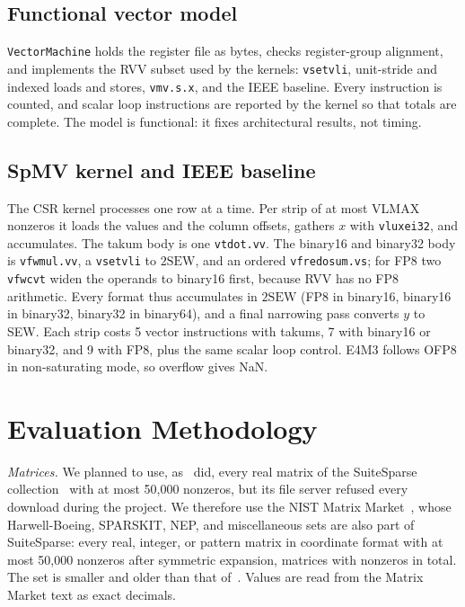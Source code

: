 \documentclass[conference]{IEEEtran}
\newcommand{\code}[1]{\texttt{#1}}
\begin{document}
\subsection{Functional vector model}
\code{VectorMachine} holds the register file as bytes, checks register-group
alignment, and implements the RVV subset used by the kernels: \code{vsetvli},
unit-stride and indexed loads and stores, \code{vmv.s.x}, and the IEEE baseline.
Every instruction is counted, and scalar loop instructions are reported by the
kernel so that totals are complete. The model is functional: it fixes
architectural results, not timing.

\subsection{SpMV kernel and IEEE baseline}\label{sec:baseline}
The CSR kernel processes one row at a time. Per strip of at most VLMAX
nonzeros it loads the values and the column offsets, gathers $x$ with
\code{vluxei32}, and accumulates. The takum body is one \code{vtdot.vv}. The
binary16 and binary32 body is \code{vfwmul.vv}, a \code{vsetvli} to $2\mathrm{SEW}$,
and an ordered \code{vfredosum.vs}; for FP8 two \code{vfwcvt} widen the operands
to binary16 first, because RVV has no FP8 arithmetic. Every format thus
accumulates in $2\mathrm{SEW}$ (FP8 in binary16, binary16 in binary32, binary32
in binary64), and a final narrowing pass converts $y$ to SEW. Each strip costs
5 vector instructions with takums, 7 with binary16 or binary32, and 9 with FP8,
plus the same scalar loop control. E4M3 follows OFP8 in non-saturating mode, so
overflow gives NaN.

\section{Evaluation Methodology}
\emph{Matrices.} We planned to use, as~\cite{simd} did, every real matrix of
the SuiteSparse collection~\cite{suitesparse} with at most 50,000 nonzeros, but
its file server refused every download during the project. We therefore use the
NIST Matrix Market~\cite{matrixmarket}, whose Harwell-Boeing, SPARSKIT, NEP,
and miscellaneous sets are also part of SuiteSparse: every real, integer, or
pattern matrix in coordinate format with at most 50,000 nonzeros after
symmetric expansion, \BenchMatrices{} matrices with \BenchNnz{} nonzeros in
total. The set is smaller and older than that of~\cite{simd}. Values are read
from the Matrix Market text as exact decimals.
\end{document}

